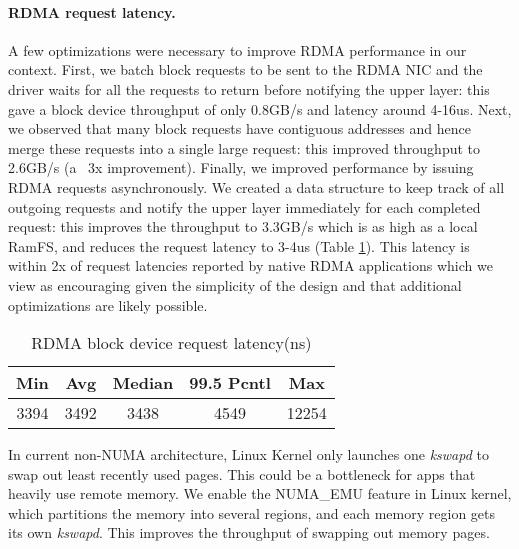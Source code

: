 \paragraph{RDMA request latency.} A few optimizations were necessary to improve RDMA performance in our context. First, we batch block requests to be sent to the RDMA NIC and the driver waits for all the requests to return before notifying the upper layer: this gave a block device throughput of only 0.8GB/s and latency around 4-16us.
Next, we observed that many block requests have contiguous addresses and hence merge these requests into a single large request: this improved throughput to 2.6GB/s (a ~3x improvement).
Finally, we improved performance by issuing RDMA requests asynchronously. We created a data structure to keep track of all outgoing requests and notify the upper layer immediately for each completed request: this improves the throughput to 3.3GB/s which is as high as a local RamFS, and reduces the request latency to 3-4us (Table \ref{tab:rdma_latency}). 
This latency is within 2x of request latencies reported by native RDMA applications which we view as encouraging given the simplicity of the design and that additional optimizations are likely possible.

\begin{table}[t]
    \centering
    \small
    \begin{tabular}{ccccc}
    \textbf{Min}	& \textbf{Avg}	& \textbf{Median} & \textbf{99.5 Pcntl}	& \textbf{Max}\\
    \hline
    3394 &	3492&	3438&	4549&	12254\\\hline
    \end{tabular}
    \caption{RDMA block device request latency(ns)}
    \label{tab:rdma_latency}
\end{table}

In current non-NUMA architecture, Linux Kernel only launches one \textit{kswapd} to swap out least recently used pages. 
This could be a bottleneck for apps that heavily use remote memory.
We enable the NUMA\_EMU feature in Linux kernel, which partitions the memory into several regions, and each memory region gets its own \textit{kswapd}. 
This improves the throughput of swapping out memory pages.




